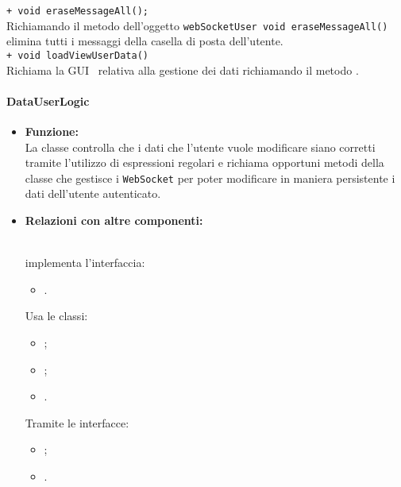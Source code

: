 {{\begin{sloppypar}
{{{\begin{itemize}
{					\texttt{+ void eraseMessageAll();}\\
					Richiamando il metodo dell'oggetto \texttt{webSocketUser void eraseMessageAll()} elimina tutti i messaggi della casella di posta dell'utente.\\					
					\texttt{+ void loadViewUserData()}\\
					Richiama la GUI\g~ relativa alla gestione dei dati richiamando il metodo .\\
				}
			\end{itemize}
			}

		

			\paragraph{DataUserLogic}\label{par:DataUserLogic}{
			\begin{itemize}
			
				\item[] \textbf{Funzione:}\\
					La classe controlla che i dati che l'utente vuole modificare siano corretti tramite l'utilizzo di espressioni regolari e richiama opportuni metodi della classe che gestisce i \texttt{WebSocket} per poter modificare in maniera persistente i dati dell'utente autenticato.\\
				
				\item[] \textbf{Relazioni con altre componenti:}{\\
					implementa l'interfaccia: 
					\begin{itemize}
						\item[] .
					\end{itemize}								
					Usa le classi:
					\begin{itemize}
						\item[] ;
						\item[] ;
						\item[] .
					\end{itemize}
					Tramite le interfacce: 
					\begin{itemize}
						\item[] ;
						\item[] .
					\end{itemize}
				}
				

\end{itemize}}}}
\end{sloppypar}}}
